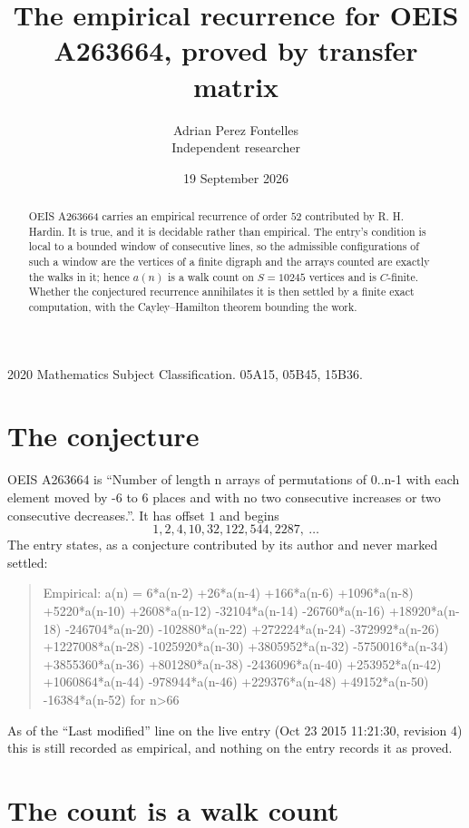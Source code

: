 \documentclass[11pt,a4paper]{article}
\title{The empirical recurrence for OEIS A263664, proved by transfer matrix}
\author{Adrian Perez Fontelles\\ \small Independent researcher}
\date{19 September 2026}
\theoremstyle{plain}
\theoremstyle{definition}
\begin{document}
\maketitle

\begin{abstract}
OEIS A263664 carries an empirical recurrence of order $52$ contributed by R. H. Hardin. It is
true, and it is decidable rather than empirical. The entry's condition is local to a bounded window of consecutive lines, so
the admissible configurations of such a window are the vertices of a finite digraph and the
arrays counted are exactly the walks in it; hence $a(n)$ is a walk count on $S=10245$ vertices
and is $C$-finite. Whether the conjectured recurrence annihilates it is then settled by a
finite exact computation, with the Cayley--Hamilton theorem bounding the work.
\end{abstract}

\noindent\small 2020 Mathematics Subject Classification. 05A15, 05B45, 15B36.\normalsize

\section{The conjecture}

OEIS A263664 is ``Number of length n arrays of permutations of 0..n-1 with each element moved by -6 to 6 places and with no two consecutive increases or two consecutive decreases.''. It has offset $1$ and begins
\[
1, 2, 4, 10, 32, 122, 544, 2287,\ \dots
\]
The entry states, as a conjecture contributed by its author and never marked settled:
\begin{quote}\raggedright\small
Empirical: a(n) = 6*a(n-2) +26*a(n-4) +166*a(n-6) +1096*a(n-8) +5220*a(n-10) +2608*a(n-12) -32104*a(n-14) -26760*a(n-16) +18920*a(n-18) -246704*a(n-20) -102880*a(n-22) +272224*a(n-24) -372992*a(n-26) +1227008*a(n-28) -1025920*a(n-30) +3805952*a(n-32) -5750016*a(n-34) +3855360*a(n-36) +801280*a(n-38) -2436096*a(n-40) +253952*a(n-42) +1060864*a(n-44) -978944*a(n-46) +229376*a(n-48) +49152*a(n-50) -16384*a(n-52) for n>66
\end{quote}
As of the ``Last modified'' line on the live entry (Oct 23 2015 11:21:30, revision 4) this is still
recorded as empirical, and nothing on the entry records it as proved.

\section{The count is a walk count}
\end{document}
